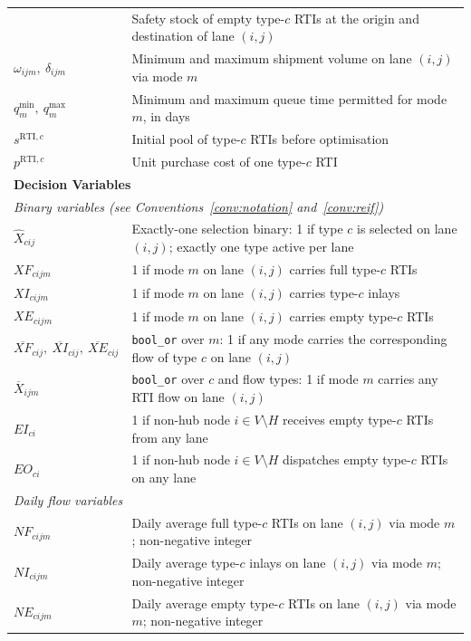 \begin{longtable}{|p{}|p{}|}
  & Safety stock of empty type-$c$ RTIs at the origin and
    destination of lane $(i,j)$ \\
$\omega_{ijm},\ \delta_{ijm}$
  & Minimum and maximum shipment volume on lane $(i,j)$
    via mode $m$ \\
$q^{\min}_{m},\ q^{\max}_{m}$
  & Minimum and maximum queue time permitted for mode $m$,
    in days \\
$s^{\text{RTI},c}$
  & Initial pool of type-$c$ RTIs before optimisation \\
$p^{\text{RTI},c}$
  & Unit purchase cost of one type-$c$ RTI \\
\hline
\multicolumn{2}{|l|}{\textbf{Decision Variables}}\\ \hline
\multicolumn{2}{|l|}{\textit{Binary variables (see
    Conventions~\ref{conv:notation} and~\ref{conv:reif})}}\\ \hline
$\hat{X}_{cij}$
  & Exactly-one selection binary: 1 if type $c$ is selected on
    lane $(i,j)$; exactly one type active per lane \\
$XF_{cijm}$
  & 1 if mode $m$ on lane $(i,j)$ carries full type-$c$ RTIs \\
$XI_{cijm}$
  & 1 if mode $m$ on lane $(i,j)$ carries type-$c$ inlays \\
$XE_{cijm}$
  & 1 if mode $m$ on lane $(i,j)$ carries empty type-$c$ RTIs \\
$\overline{XF}_{cij},\
 \overline{XI}_{cij},\
 \overline{XE}_{cij}$
  & \texttt{bool\_or} over $m$: 1 if any mode carries the
    corresponding flow of type $c$ on lane $(i,j)$ \\
$\overline{X}_{ijm}$
  & \texttt{bool\_or} over $c$ and flow types: 1 if mode $m$
    carries any RTI flow on lane $(i,j)$ \\
$EI_{ci}$
  & 1 if non-hub node $i \in V\setminus H$ receives empty
    type-$c$ RTIs from any lane \\
$EO_{ci}$
  & 1 if non-hub node $i \in V\setminus H$ dispatches empty
    type-$c$ RTIs on any lane \\
\hline
\multicolumn{2}{|l|}{\textit{Daily flow variables}}\\ \hline
$NF_{cijm}$
  & Daily average full type-$c$ RTIs on lane $(i,j)$ via mode $m$;
    non-negative integer \\
$NI_{cijm}$
  & Daily average type-$c$ inlays on lane $(i,j)$ via mode $m$;
    non-negative integer \\
$NE_{cijm}$
  & Daily average empty type-$c$ RTIs on lane $(i,j)$ via mode $m$;
    non-negative integer \\

\end{longtable}
